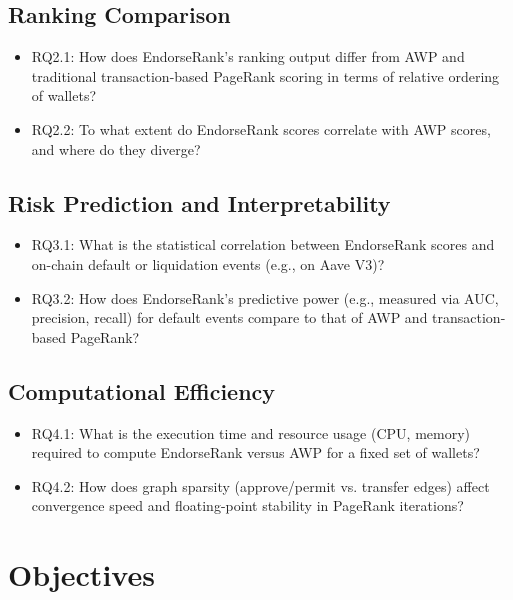 \documentclass[
]{article}
\begin{document}
\subsection{Ranking Comparison}\label{ranking-comparison}

\begin{itemize}
\item
  RQ2.1: How does EndorseRank's ranking output differ from AWP and traditional transaction-based PageRank scoring in terms of relative ordering of wallets?
\item
  RQ2.2: To what extent do EndorseRank scores correlate with AWP scores, and where do they diverge?
\end{itemize}

\subsection{Risk Prediction and Interpretability}\label{risk-prediction-and-interpretability}

\begin{itemize}
\item
  RQ3.1: What is the statistical correlation between EndorseRank scores and on-chain default or liquidation events (e.g., on Aave V3)?
\item
  RQ3.2: How does EndorseRank's predictive power (e.g., measured via AUC, precision, recall) for default events compare to that of AWP and transaction-based PageRank?
\end{itemize}

\subsection{Computational Efficiency}\label{computational-efficiency}

\begin{itemize}
\item
  RQ4.1: What is the execution time and resource usage (CPU, memory) required to compute EndorseRank versus AWP for a fixed set of wallets?
\item
  RQ4.2: How does graph sparsity (approve/permit vs. transfer edges) affect convergence speed and floating-point stability in PageRank iterations?
\end{itemize}

\section{Objectives}\label{objectives}
\end{document}

